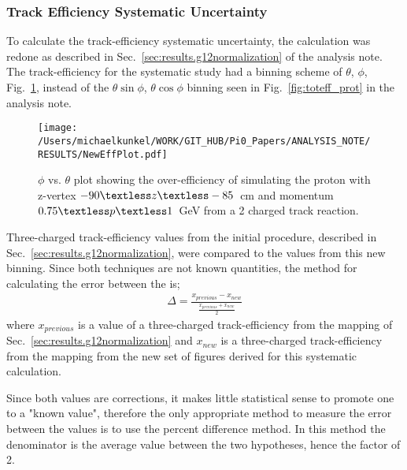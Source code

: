 \subsubsection{Track Efficiency Systematic Uncertainty}
 
	To calculate the track-efficiency systematic uncertainty, the calculation was redone as described in Sec.~\ref{sec:results.g12normalization} of the analysis note. The track-efficiency for the systematic study had a binning scheme of $\theta$, $\phi$, Fig.~\ref{fig:toteff_protnew}, instead of the $\theta \sin\phi$, $\theta \cos\phi$ binning seen in Fig.~\ref{fig:toteff_prot} in the analysis note.
	
	\begin{figure}[h!]\begin{center}
			\texttt{[image: /Users/michaelkunkel/WORK/GIT\_HUB/Pi0\_Papers/ANALYSIS\_NOTE/RESULTS/NewEffPlot.pdf]}
			\caption[$\phi$ vs. $\theta$ plot showing the over-efficiency of simulating the proton with z-vertex $-90\textless z\textless-85$~cm and momentum $0.75\textless p \textless 1$~GeV from a 2 charged track reaction]{\label{fig:toteff_protnew} $\phi$ vs. $\theta$ plot showing the over-efficiency of simulating the proton with z-vertex $-90\textless z\textless-85$~cm and momentum $0.75\textless p \textless 1$~GeV from a 2 charged track reaction.}
		\end{center}\end{figure}
		
		Three-charged track-efficiency values from the initial procedure, described in Sec.~\ref{sec:results.g12normalization}, were compared to the values from this new binning. Since both techniques are not known quantities, the method for calculating the error between the is;
		\begin{align}
		\Delta = \frac{x_{previous} -x_{new} }{\frac{x_{previous} +x_{new}}{2}}
		\end{align}	
		where $x_{previous}$ is a value of a three-charged track-efficiency from the mapping of Sec.~\ref{sec:results.g12normalization} and $x_{new}$ is a three-charged track-efficiency from the mapping from the new set of figures derived for this systematic calculation.
		
		Since both values are corrections, it makes little statistical sense to promote one to a "known value", therefore the only appropriate method to measure the error between the values is to use the percent difference method. In this method the denominator is the average value between the two hypotheses, hence the factor of 2.
		

